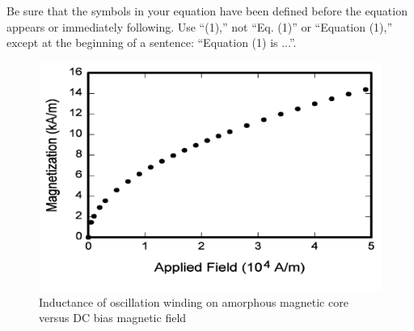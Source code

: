 \documentclass[letterpaper, 10 pt, conference]{ieeeconf}  %
\begin{document}
Be sure that the symbols in your equation have been defined before the
equation appears or immediately following.
Use ``(1),'' not ``Eq. (1)'' or ``Equation (1),''
except at the beginning of a sentence: ``Equation (1) is ...''.

   \begin{figure}[tpb]
      \centering
      \includegraphics[width=0.9\columnwidth]{figurefile}
      \caption{Inductance of oscillation winding on amorphous
       magnetic core versus DC bias magnetic field}
      \label{figurelabel}
   \end{figure}

\end{document}
